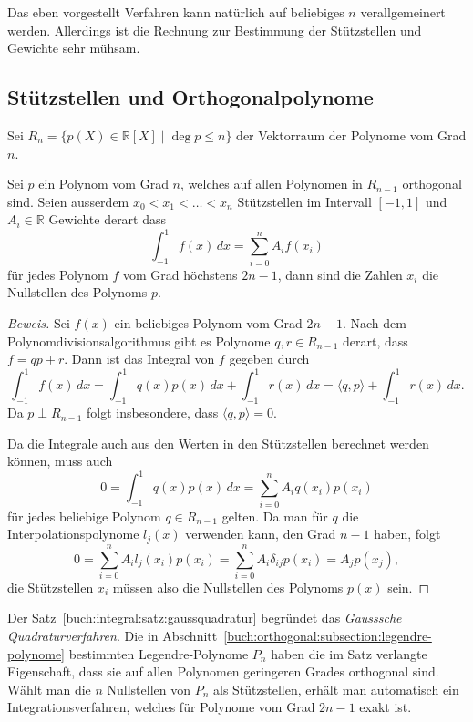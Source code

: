 Das eben vorgestellt Verfahren kann natürlich auf beliebiges $n$
verallgemeinert werden.
Allerdings ist die Rechnung zur Bestimmung der Stützstellen und
Gewichte sehr mühsam.

\subsection{Stützstellen und Orthogonalpolynome}
Sei $R_n=\{p(X)\in\mathbb{R}[X] \mid \deg p\le n\}$ der Vektorraum
der Polynome vom Grad $n$.

\begin{satz}
%
\label{buch:integral:satz:gaussquadratur}
Sei $p$ ein Polynom vom Grad $n$, welches auf allen Polynomen in $R_{n-1}$
orthogonal sind.
Seien ausserdem $x_0<x_1<\dots<x_n$ Stützstellen im Intervall $[-1,1]$ 
und $A_i\in\mathbb{R}$ Gewichte derart dass
\[
\int_{-1}^1 f(x)\,dx =
\sum_{i=0}^n A_if(x_i)
\]
für jedes Polynom $f$ vom Grad höchstens $2n-1$, dann sind die Zahlen
$x_i$ die Nullstellen des Polynoms $p$.
\end{satz}

\begin{proof}[Beweis]
Sei $f(x)$ ein beliebiges Polynom vom Grad $2n-1$.
Nach dem Polynomdivisionsalgorithmus gibt es
Polynome $q,r\in R_{n-1}$ derart, dass $f=qp+r$.
Dann ist das Integral von $f$ gegeben durch
\[
\int_{-1}^1 f(x)\,dx
=
\int_{-1}^1q(x) p(x)\,dx + \int_{-1}^1 r(x)\,dx
=
\langle q,p\rangle + \int_{-1}^1 r(x)\,dx.
\]
Da $p\perp R_{n-1}$ folgt insbesondere, dass $\langle q,p\rangle=0$.

Da die Integrale auch aus den Werten in den Stützstellen berechnet
werden können, muss auch
\[
0
=
\int_{-1}^1 q(x)p(x)\,dx
=
\sum_{i=0}^n A_iq(x_i)p(x_i)
\]
für jedes beliebige Polynom $q\in R_{n-1}$ gelten.
Da man für $q$ die Interpolationspolynome $l_j(x)$ verwenden
kann, den Grad $n-1$ haben, folgt
\[
0
=
\sum_{i=0}^n
A_il_j(x_i)p(x_i)
=
\sum_{i=0}^n A_i\delta_{ij}p(x_i)
=
A_jp(x_j),
\]
die Stützstellen $x_i$ müssen also die Nullstellen des Polynoms
$p(x)$ sein.
\end{proof}

Der Satz~\ref{buch:integral:satz:gaussquadratur} begründet das
{\em Gausssche Quadraturverfahren}.
Die in Abschnitt~\ref{buch:orthogonal:subsection:legendre-polynome}
bestimmten Legendre-Polynome $P_n$ haben die im Satz
verlangte Eigenschaft,
dass sie auf allen Polynomen geringeren Grades orthogonal sind.
Wählt man die $n$ Nullstellen von $P_n$ als Stützstellen, erhält man 
automatisch ein Integrationsverfahren, welches für Polynome vom Grad
$2n-1$ exakt ist.

